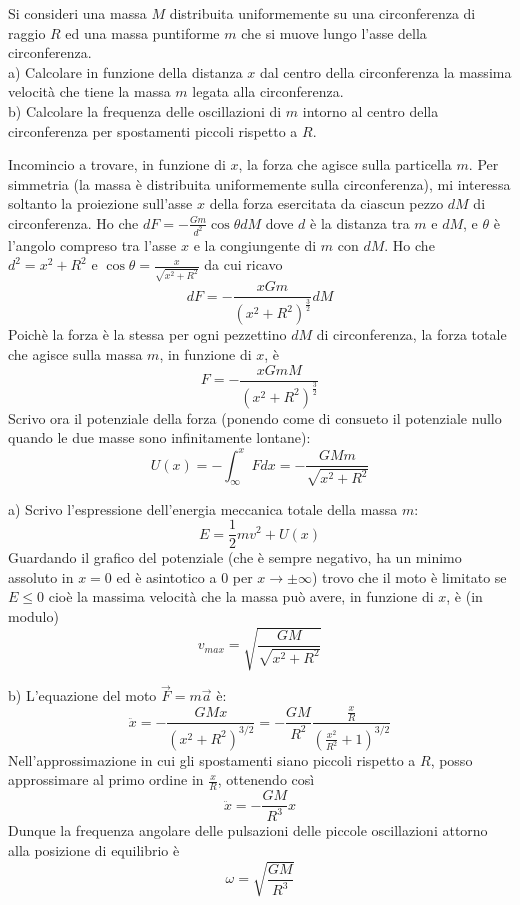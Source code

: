 \documentclass[../main.tex]{subfiles}
\begin{document}

\textex
Si consideri una massa $M$ distribuita uniformemente su una circonferenza di raggio $R$ ed una massa puntiforme $m$ che si muove lungo l'asse della circonferenza.\\
a) Calcolare in funzione della distanza $x$ dal centro della circonferenza la massima velocità che tiene la massa $m$ legata alla circonferenza.\\
b) Calcolare la frequenza delle oscillazioni di $m$ intorno al centro della circonferenza per spostamenti piccoli rispetto a $R$.

\solution
Incomincio a trovare, in funzione di $x$, la forza che agisce sulla particella $m$.
Per simmetria (la massa è distribuita uniformemente sulla circonferenza), mi interessa soltanto la proiezione sull'asse $x$ della forza esercitata da ciascun pezzo $dM$ di circonferenza.
Ho che $dF = -\frac{Gm}{d^2}\cos\theta dM$ dove $d$ è la distanza tra $m$ e $dM$, e $\theta$ è l'angolo compreso tra l'asse $x$ e la congiungente di $m$ con $dM$. Ho che $d^2 = x^2 + R^2$ e $\cos\theta = \frac{x}{\sqrt{x^2+R^2}}$ da cui ricavo
$$ dF = -\frac{xGm}{\left ( x^2+R^2\right )^{\frac{3}{2}}}dM$$
Poichè la forza è la stessa per ogni pezzettino $dM$ di circonferenza, la forza totale che agisce sulla massa $m$, in funzione di $x$, è
$$ F = -\frac{xGmM}{\left ( x^2+R^2\right )^{\frac{3}{2}}}$$
Scrivo ora il potenziale della forza (ponendo come di consueto il potenziale nullo quando le due masse sono infinitamente lontane): $$U(x) = -\int_{\infty}^{x} F dx = -\frac{GMm}{\sqrt{x^2+R^2}} $$

a) Scrivo l'espressione dell'energia meccanica totale della massa $m$:
$$ E = \frac{1}{2} m v^2+U(x)$$
Guardando il grafico del potenziale (che è sempre negativo, ha un minimo assoluto in $x=0$ ed è asintotico a 0 per $x\rightarrow \pm\infty$) trovo che il moto è limitato se $E\le 0$ cioè la massima velocità che la massa può avere, in funzione di $x$, è (in modulo)
$$ {v_{max}} = \sqrt{\frac{GM}{\sqrt{x^2+R^2}}} $$

b) L'equazione del moto $\overrightarrow F = m\overrightarrow a$ è: $$\ddot x = -\frac{GMx}{\left ( x^2+R^2\right )^{3/2}} = -\frac{GM}{R^2} \frac{\frac{x}{R}}{\left ( \frac{x^2}{R^2} + 1 \right ) ^{3/2}} $$
Nell'approssimazione in cui gli spostamenti siano piccoli rispetto a $R$, posso approssimare al primo ordine in $\frac{x}{R}$, ottenendo così $$\ddot x = -\frac{GM}{R^3}x $$
Dunque la frequenza angolare delle pulsazioni delle piccole oscillazioni attorno alla posizione di equilibrio è $$ \omega = \sqrt{\frac{GM}{R^3}} $$
\end{document}
